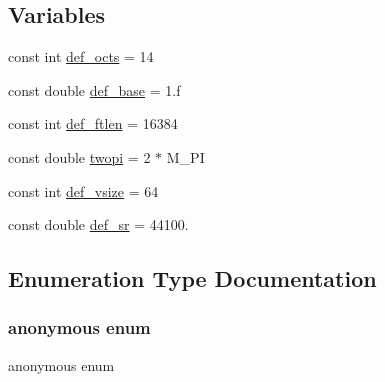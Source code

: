 \subsection*{Variables}
\begin{DoxyCompactItemize}
\item 
const int \hyperlink{namespace_aurora_a09d7b7aef171c72e46db6eac0226636b}{def\+\_\+octs} = 14
\item 
const double \hyperlink{namespace_aurora_acb267dff62f74484893c2d5b679b78bf}{def\+\_\+base} = 1.f
\item 
const int \hyperlink{namespace_aurora_a14dabfd9feedfa09c0e6f86d2627f006}{def\+\_\+ftlen} = 16384
\item 
const double \hyperlink{namespace_aurora_a4c08f8416c2b35d5001062f121459b5a}{twopi} = 2 $\ast$ M\+\_\+\+PI
\item 
const int \hyperlink{namespace_aurora_afaaddf667a06e7ce23c667a8b7295263}{def\+\_\+vsize} = 64
\item 
const double \hyperlink{namespace_aurora_ad49263d809bea98dd422e95bc91bc03e}{def\+\_\+sr} = 44100.
\end{DoxyCompactItemize}


\subsection{Enumeration Type Documentation}
\mbox{\label{namespace_aurora_a890b8d3786c8a25750e8097adae3b513}} 
\subsubsection{\texorpdfstring{anonymous enum}{anonymous enum}}
{\footnotesize\ttfamily anonymous enum}

